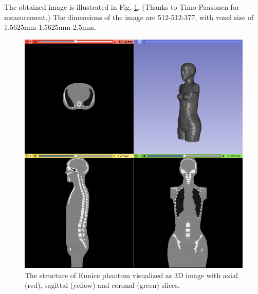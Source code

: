 \documentclass[fleqn,10pt]{SelfArx} %
\begin{document}
The obtained image is illustrated in Fig. \ref{fig:EunicePhantom}. (Thanks to Timo Paasonen for measurement.) The dimensions of the image are 512-512-377, with voxel size of 1.5625mm-1.5625mm-2.5mm.

\begin{figure}[ht]\centering
\includegraphics[width=0.9\linewidth]{Eunice}
\caption{The structure of Eunice phantom visualized as 3D image with axial (red), sagittal (yellow) and coronal (green) slices.}
\label{fig:EunicePhantom}
\end{figure}




\end{document}
